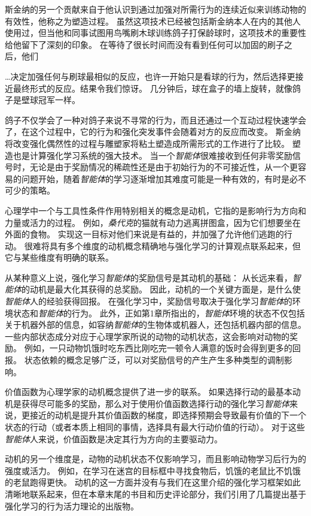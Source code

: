 斯金纳的另一个贡献来自于他认识到通过加强对所需行为的连续近似来训练动物的有效性，他称之为塑造过程。
虽然这项技术已经被包括斯金纳本人在内的其他人使用过，但当他和同事试图用鸟嘴刷木球训练鸽子打保龄球时，这项技术的重要性给他留下了深刻的印象。
在等待了很长时间而没有看到任何可以加固的刷子之后，他们


…决定加强任何与刷球最相似的反应，也许一开始只是看球的行为，然后选择更接近最终形式的反应。结果令我们惊讶。
几分钟后，球在盒子的墙上旋转，就像鸽子是壁球冠军一样\cite{skinner1958reinforcement}。


鸽子不仅学会了一种对鸽子来说不寻常的行为，而且还通过一个互动过程快速学会了，在这个过程中，它的行为和强化突发事件会随着对方的反应而改变。
斯金纳将改变强化偶然性的过程与雕塑家将粘土塑造成所需形式的工作进行了比较。
塑造也是计算强化学习系统的强大技术。
当一个\textit{智能体}很难接收到任何非零奖励信号时，无论是由于奖励情况的稀疏性还是由于初始行为的不可接近性，从一个更容易的问题开始，随着\textit{智能体}的学习逐渐增加其难度可能是一种有效的，有时是必不可少的策略。


心理学中一个与工具性条件作用特别相关的概念是动机，它指的是影响行为方向和力量或活力的过程。
例如，\textit{桑代克}的猫就有动力逃离拼图盒，因为它们想要坐在外面的食物。
实现这一目标对他们来说是有益的，并加强了允许他们逃跑的行动。
很难将具有多个维度的动机概念精确地与强化学习的计算观点联系起来，但它与某些维度有明确的联系。


从某种意义上说，强化学习\textit{智能体}的奖励信号是其动机的基础：
从长远来看，\textit{智能体}的动机是最大化其获得的总奖励。
因此，动机的一个关键方面是，是什么使\textit{智能体}人的经验获得回报。
在强化学习中，奖励信号取决于强化学习\textit{智能体}的环境状态和\textit{智能体}的行为。
此外，正如第1章所指出的，\textit{智能体}环境的状态不仅包括关于机器外部的信息，如容纳\textit{智能体}的生物体或机器人，还包括机器内部的信息。
一些内部状态成分对应于心理学家所说的动物的动机状态，这会影响对动物的奖励。
例如，一只动物饥饿时吃东西比刚吃完一顿令人满意的饭时会得到更多的回报。
状态依赖的概念足够广泛，可以对奖励信号的产生产生多种类型的调制影响。


价值函数为心理学家的动机概念提供了进一步的联系。
如果选择行动的最基本动机是获得尽可能多的奖励，那么对于使用价值函数选择行动的强化学习\textit{智能体}来说，更接近的动机是提升其价值函数的梯度，即选择预期会导致最有价值的下一个状态的行动（或者本质上相同的事情，选择具有最大行动价值的行动）。
对于这些\textit{智能体}人来说，价值函数是决定其行为方向的主要驱动力。


动机的另一个维度是，动物的动机状态不仅影响学习，而且影响动物学习后行为的强度或活力。
例如，在学习在迷宫的目标框中寻找食物后，饥饿的老鼠比不饥饿的老鼠跑得更快。
动机的这一方面并没有与我们在这里介绍的强化学习框架如此清晰地联系起来，但在本章末尾的书目和历史评论部分，我们引用了几篇提出基于强化学习的行为活力理论的出版物。


